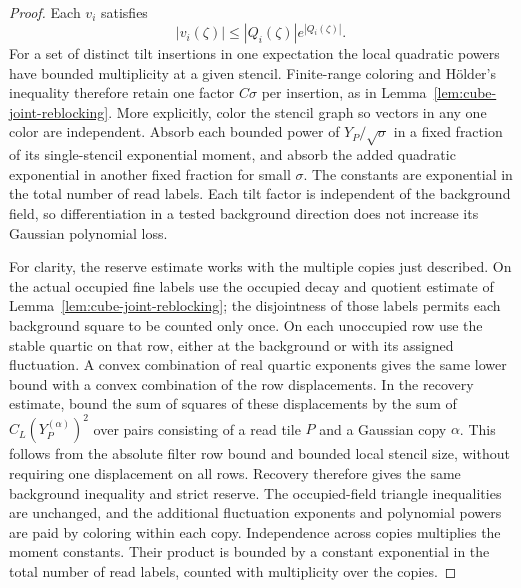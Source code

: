 \documentclass[11pt]{article}
\theoremstyle{definition}
\begin{document}
\begin{proof}
Each \(v_i\) satisfies
\begin{equation}
 |v_i(\zeta)|\le |Q_i(\zeta)|e^{|Q_i(\zeta)|}.
\end{equation}
For a set of distinct tilt insertions in one expectation the
local quadratic powers have bounded multiplicity at a given
stencil. Finite-range coloring and H\"older's inequality
therefore retain one factor \(C\sigma\) per insertion, as
in Lemma~\ref{lem:cube-joint-reblocking}. More explicitly,
color the stencil graph so vectors in any one color are
independent. Absorb each bounded power of \(Y_P/\sqrt\sigma\)
in a fixed fraction of its single-stencil exponential
moment, and absorb the added quadratic exponential in
another fixed fraction for small \(\sigma\). The constants
are exponential in the total number of read labels. Each
tilt factor is independent of the background field, so
differentiation in a tested background direction does not
increase its Gaussian polynomial loss.

For clarity, the reserve estimate works with the multiple
copies just described. On the actual occupied fine labels
use the occupied decay and quotient estimate of
Lemma~\ref{lem:cube-joint-reblocking}; the disjointness
of those labels permits each background square to be counted
only once. On each unoccupied row use the stable quartic on
that row, either at the background or with its assigned
fluctuation. A convex combination of real quartic exponents
gives the same lower bound with a convex combination of the
row displacements. In the recovery estimate, bound the sum
of squares of these displacements by the sum of
\(C_L(Y_P^{(\alpha)})^2\) over pairs consisting of a read
tile \(P\) and a Gaussian copy \(\alpha\). This follows
from the absolute filter row bound and bounded local
stencil size, without requiring one displacement on all
rows. Recovery therefore gives the same background
inequality and strict reserve. The occupied-field
triangle inequalities are unchanged, and the additional
fluctuation exponents and polynomial powers are paid by
coloring within each copy. Independence across copies
multiplies the moment constants. Their product is bounded
by a constant exponential in the total number of read
labels, counted with multiplicity over the copies.


\end{proof}
\end{document}
